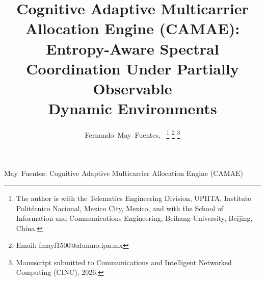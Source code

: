 \documentclass[journal,10pt,twocolumn,twoside]{IEEEtran}
\begin{document}
\title{Cognitive Adaptive Multicarrier Allocation Engine (CAMAE): \\
Entropy-Aware Spectral Coordination Under Partially Observable \\ Dynamic Environments}

\author{Fernando~May~Fuentes,~
\thanks{The author is with the Telematics Engineering Division, UPIITA, Instituto Polit\'{e}cnico Nacional, Mexico City, Mexico, and with the School of Information and Communications Engineering, Beihang University, Beijing, China.}
\thanks{Email: fmayf1500@alumno.ipn.mx}
\thanks{Manuscript submitted to Communications and Intelligent Networked Computing (CINC), 2026.}}

%
{May~Fuentes: Cognitive Adaptive Multicarrier Allocation Engine (CAMAE)}

\maketitle
\end{document}

